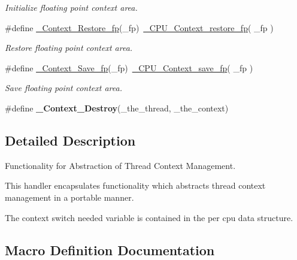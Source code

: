 \begin{DoxyCompactItemize}
\begin{DoxyCompactList}\small\item\em Initialize floating point context area. \end{DoxyCompactList}\item 
\#define \mbox{\hyperlink{group__RTEMSScoreContext_gab2919317d5dbb7a40cfd3371c2195871}{\+\_\+\+Context\+\_\+\+Restore\+\_\+fp}}(\+\_\+fp)~\mbox{\hyperlink{sparc_2include_2rtems_2score_2cpu_8h_a8d77a957f827a9250794f9ad754acbf5}{\+\_\+\+C\+P\+U\+\_\+\+Context\+\_\+restore\+\_\+fp}}( \+\_\+fp )
\begin{DoxyCompactList}\small\item\em Restore floating point context area. \end{DoxyCompactList}\item 
\#define \mbox{\hyperlink{group__RTEMSScoreContext_gae7f5511c583da82fa4bcf8da870ef1c2}{\+\_\+\+Context\+\_\+\+Save\+\_\+fp}}(\+\_\+fp)~\mbox{\hyperlink{sparc_2include_2rtems_2score_2cpu_8h_ae8d9251a320d6920e3c8d6e45eb38fad}{\+\_\+\+C\+P\+U\+\_\+\+Context\+\_\+save\+\_\+fp}}( \+\_\+fp )
\begin{DoxyCompactList}\small\item\em Save floating point context area. \end{DoxyCompactList}\item 
\mbox{\label{group__RTEMSScoreContext_gac92500d6e9e903ad709c4124e9818663}} 
\#define {\bfseries \+\_\+\+Context\+\_\+\+Destroy}(\+\_\+the\+\_\+thread,  \+\_\+the\+\_\+context)
\end{DoxyCompactItemize}


\subsection{Detailed Description}
Functionality for Abstraction of Thread Context Management. 

This handler encapsulates functionality which abstracts thread context management in a portable manner.

The context switch needed variable is contained in the per cpu data structure. 

\subsection{Macro Definition Documentation}
\mbox{\label{group__RTEMSScoreContext_ga2ef1ba43fa949a447be59fe34ecf6e96}} 

